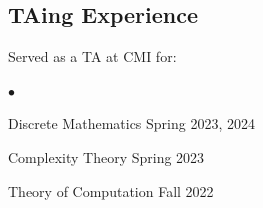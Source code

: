 \documentclass[margin,line, 10pt]{res}
\newenvironment{list2}{
  \begin{list}{$\bullet$}{%
      \setlength{\itemsep}{0in}
      \setlength{\parsep}{0in} \setlength{\parskip}{0in}
      \setlength{\topsep}{0in} \setlength{\partopsep}{0in} 
      \setlength{\leftmargin}{0.2in}}}{\end{list}}
\begin{document}
\begin{resume}
\section{\sc TAing Experience}
Served as a TA at CMI for:
\begin{list2}
    \item Discrete Mathematics \hfill Spring 2023, 2024
    \item Complexity Theory \hfill Spring 2023
    \item Theory of Computation \hfill Fall 2022
\end{list2}


\end{resume}
\thispagestyle{lastpage}
\end{document}
